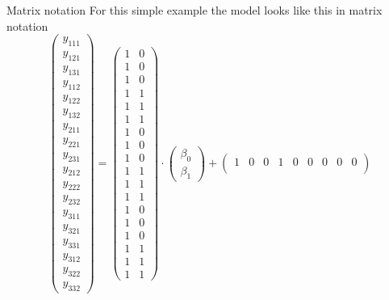 \documentclass[aspectratio=169]{beamer}
\begin{document}
\begin{frame}{Matrix notation}
For this simple example the model looks like this in matrix notation
\scriptsize
\begin{equation*}
  \begin{pmatrix}
    y_{111} \\
    y_{121} \\
    y_{131} \\
    y_{112} \\
    y_{122} \\
    y_{132} \\
    y_{211} \\
    y_{221} \\
    y_{231} \\
    y_{212} \\
    y_{222} \\
    y_{232} \\
    y_{311} \\
    y_{321} \\
    y_{331} \\
    y_{312} \\
    y_{322} \\
    y_{332}
  \end{pmatrix} =
  \begin{pmatrix}
    1 & 0 \\
    1 & 0 \\
    1 & 0 \\
    1 & 1 \\
    1 & 1 \\
    1 & 1 \\
    1 & 0 \\
    1 & 0 \\
    1 & 0 \\
    1 & 1 \\
    1 & 1 \\
    1 & 1 \\
    1 & 0 \\
    1 & 0 \\
    1 & 0 \\
    1 & 1 \\
    1 & 1 \\
    1 & 1
  \end{pmatrix} \cdot
  \begin{pmatrix}
    \beta_0 \\
    \beta_1
  \end{pmatrix} +
  \begin{pmatrix}
    1 & 0 & 0 & 1 & 0 & 0 & 0 & 0 & 0 \\

\end{pmatrix}
\end{equation*}
\end{frame}
\end{document}
